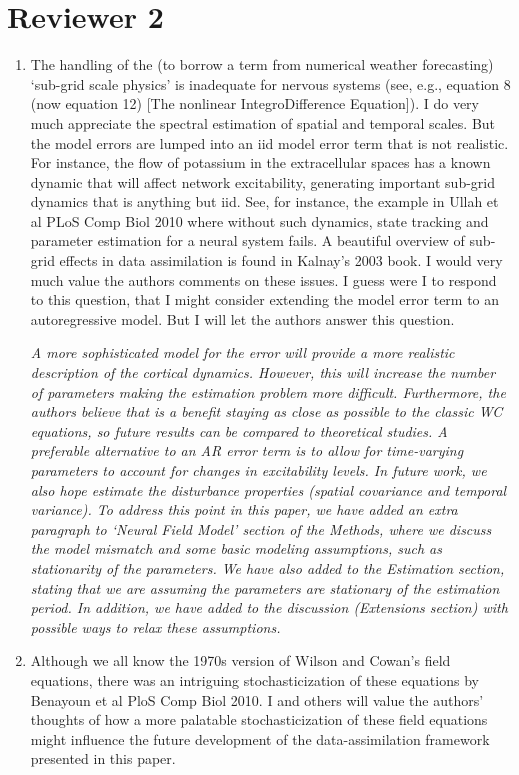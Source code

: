 \documentclass{article}
\begin{document}
    \section{Reviewer 2}
    
\begin{enumerate}
    \item The handling of the (to borrow a term from numerical weather forecasting) `sub-grid scale physics' is inadequate for nervous systems (see, e.g., equation 8 (now equation 12) [The nonlinear IntegroDifference Equation]). I do very much appreciate the spectral estimation of spatial and temporal scales. But the model errors are lumped into an iid model error term that is not realistic. For instance, the flow of potassium in the extracellular spaces has a known dynamic that will affect network excitability, generating important sub-grid dynamics that is anything but iid. See, for instance, the example in Ullah et al PLoS Comp Biol 2010 where without such dynamics, state tracking and parameter estimation for a neural system fails. A beautiful overview of sub-grid effects in data assimilation is found in Kalnay's 2003 book. I would very much value the authors comments on these issues. I guess were I to respond to this question, that I might consider extending the model error term to an autoregressive model. But I will let the authors answer this question.

	\emph{A more sophisticated model for the error will provide a more realistic description of the cortical dynamics. However, this will increase the number of parameters making the estimation problem more difficult. Furthermore, the authors believe that is a benefit staying as close as possible to the classic WC equations, so future results can be compared to theoretical studies. A preferable alternative to an AR error term is to allow for time-varying parameters to account for changes in excitability levels. In future work, we also hope estimate the disturbance properties (spatial covariance and temporal variance). To address this point in this paper, we have added an extra paragraph to `Neural Field Model' section of the Methods, where we discuss the model mismatch and some basic modeling assumptions, such as stationarity of the parameters. We have also added to the Estimation section, stating that we are assuming the parameters are stationary of the estimation period. In addition, we have added to the discussion (Extensions section) with possible ways to relax these assumptions.}

\item Although we all know the 1970s version of Wilson and Cowan's field equations, there was an intriguing stochasticization of these equations by Benayoun et al PloS Comp Biol 2010. I and others will value the authors' thoughts of how a more palatable stochasticization of these field equations might influence the future development of the data-assimilation framework presented in this paper.


\end{enumerate}
\end{document}

